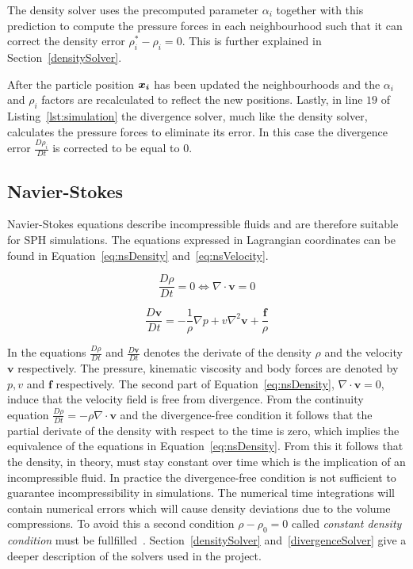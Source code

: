 The density solver uses the precomputed parameter $\alpha_i$ together with this prediction to compute the pressure forces in each neighbourhood such that it can correct the density error $\rho_i^* - \rho_i = 0$.
This is further explained in Section~\ref{densitySolver}.

After the particle position $\bm{x_i}$ has been updated the neighbourhoods and the $\alpha_i$ and $\rho_i$ factors are recalculated to reflect the new positions.
Lastly, in line $19$ of Listing~\ref{lst:simulation} the divergence solver, much like the density solver, calculates the pressure forces to eliminate its error.
In this case the divergence error $\frac{D\rho_i}{Dt}$ is corrected to be equal to $0$.

\subsection{Navier-Stokes}
    Navier-Stokes equations describe incompressible fluids and are therefore suitable for SPH simulations.
    The equations expressed in Lagrangian coordinates can be found in Equation~\ref{eq:nsDensity} and~\ref{eq:nsVelocity}.

    \begin{equation} \label{eq:nsDensity}
        \frac{D\rho}{Dt} = 0 \Leftrightarrow \nabla \cdot \textbf{v} = 0 
    \end{equation}

    \begin{equation} \label{eq:nsVelocity}
        \frac{D\textbf{v}}{Dt} = -\frac{1}{\rho} \nabla p + v \nabla ^2 \textbf{v} + \frac{\textbf{f}}{\rho}
    \end{equation}

    In the equations $\frac{D\rho}{Dt}$ and $\frac{D\textbf{v}}{Dt}$ denotes the derivate of the density $\rho$ and the velocity $\textbf{v}$ respectively.
    The pressure, kinematic viscosity and body forces are denoted by $p,v$ and $\textbf{f}$ respectively.
    The second part of Equation~\ref{eq:nsDensity}, $\nabla \cdot \textbf{v} = 0$, induce that the velocity field is free from divergence.
    From the continuity equation $\frac{D\rho}{Dt} = -\rho \nabla \cdot \textbf{v}$ and the divergence-free condition it follows that the partial derivate of the density with respect to the time is zero, which implies the equivalence of the equations in Equation~\ref{eq:nsDensity}.
    From this it follows that the density, in theory, must stay constant over time which is the implication of an incompressible fluid.
    In practice the divergence-free condition is not sufficient to guarantee incompressibility in simulations.
    The numerical time integrations will contain numerical errors which will cause density deviations due to the volume compressions.
    To avoid this a second condition $\rho - \rho_0 = 0$ called \textit{constant density condition} must be fullfilled~\cite{bender}.
    Section~\ref{densitySolver} and~\ref{divergenceSolver} give a deeper description of the solvers used in the project.


